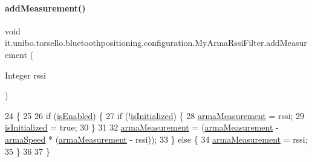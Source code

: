 \paragraph{\texorpdfstring{add\+Measurement()}{addMeasurement()}}
{\footnotesize\ttfamily void it.\+unibo.\+torsello.\+bluetoothpositioning.\+configuration.\+My\+Arma\+Rssi\+Filter.\+add\+Measurement (\begin{DoxyParamCaption}\item[{Integer}]{rssi }\end{DoxyParamCaption})}


\begin{DoxyCode}
24                                              \{
25 
26         \textcolor{keywordflow}{if} (\hyperlink{classit_1_1unibo_1_1torsello_1_1bluetoothpositioning_1_1configuration_1_1MyArmaRssiFilter_a7a046687ef0d8dd63307cabfbb33fcf8_a7a046687ef0d8dd63307cabfbb33fcf8}{isEnabled}) \{
27             \textcolor{keywordflow}{if} (!\hyperlink{classit_1_1unibo_1_1torsello_1_1bluetoothpositioning_1_1configuration_1_1MyArmaRssiFilter_a01cc7f81fd8e0ca8ed3c197d9fc1fd11_a01cc7f81fd8e0ca8ed3c197d9fc1fd11}{isInitialized}) \{
28                 \hyperlink{classit_1_1unibo_1_1torsello_1_1bluetoothpositioning_1_1configuration_1_1MyArmaRssiFilter_a2be11d7395143321b8f2063afe14a8d0_a2be11d7395143321b8f2063afe14a8d0}{armaMeasurement} = rssi;
29                 \hyperlink{classit_1_1unibo_1_1torsello_1_1bluetoothpositioning_1_1configuration_1_1MyArmaRssiFilter_a01cc7f81fd8e0ca8ed3c197d9fc1fd11_a01cc7f81fd8e0ca8ed3c197d9fc1fd11}{isInitialized} = \textcolor{keyword}{true};
30             \}
31 
32             \hyperlink{classit_1_1unibo_1_1torsello_1_1bluetoothpositioning_1_1configuration_1_1MyArmaRssiFilter_a2be11d7395143321b8f2063afe14a8d0_a2be11d7395143321b8f2063afe14a8d0}{armaMeasurement} = (\hyperlink{classit_1_1unibo_1_1torsello_1_1bluetoothpositioning_1_1configuration_1_1MyArmaRssiFilter_a2be11d7395143321b8f2063afe14a8d0_a2be11d7395143321b8f2063afe14a8d0}{armaMeasurement} - 
      \hyperlink{classit_1_1unibo_1_1torsello_1_1bluetoothpositioning_1_1configuration_1_1MyArmaRssiFilter_a5332b55e26b28536d1f8c7cae5e684b4_a5332b55e26b28536d1f8c7cae5e684b4}{armaSpeed} * (\hyperlink{classit_1_1unibo_1_1torsello_1_1bluetoothpositioning_1_1configuration_1_1MyArmaRssiFilter_a2be11d7395143321b8f2063afe14a8d0_a2be11d7395143321b8f2063afe14a8d0}{armaMeasurement} - rssi));
33         \} \textcolor{keywordflow}{else} \{
34             \hyperlink{classit_1_1unibo_1_1torsello_1_1bluetoothpositioning_1_1configuration_1_1MyArmaRssiFilter_a2be11d7395143321b8f2063afe14a8d0_a2be11d7395143321b8f2063afe14a8d0}{armaMeasurement} = rssi;
35         \}
36 
37     \}
\end{DoxyCode}
